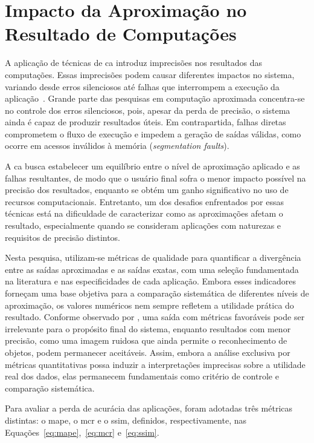 \section{Impacto da Aproximação no Resultado de Computações}\label{sec:impacto}

A aplicação de técnicas de \gls{ca} introduz imprecisões nos resultados das computações. Essas imprecisões podem causar diferentes impactos no sistema, variando desde erros silenciosos até falhas que interrompem a execução da aplicação~\cite{fabricio2022}. Grande parte das pesquisas em computação aproximada concentra-se no controle dos erros silenciosos, pois, apesar da perda de precisão, o sistema ainda é capaz de produzir resultados úteis. Em contrapartida, falhas diretas comprometem o fluxo de execução e impedem a geração de saídas válidas, como ocorre em acessos inválidos à memória (\textit{segmentation faults}).

A \gls{ca} busca estabelecer um equilíbrio entre o nível de aproximação aplicado e as falhas resultantes, de modo que o usuário final sofra o menor impacto possível na precisão dos resultados, enquanto se obtém um ganho significativo no uso de recursos computacionais. Entretanto, um dos desafios enfrentados por essas técnicas está na dificuldade de caracterizar como as aproximações afetam o resultado, especialmente quando se consideram aplicações com naturezas e requisitos de precisão distintos.

Nesta pesquisa, utilizam-se métricas de qualidade para quantificar a divergência entre as saídas aproximadas e as saídas exatas, com uma seleção fundamentada na literatura e nas especificidades de cada aplicação. Embora esses indicadores forneçam uma base objetiva para a comparação sistemática de diferentes níveis de aproximação, os valores numéricos nem sempre refletem a utilidade prática do resultado. Conforme observado por , uma saída com métricas favoráveis pode ser irrelevante para o propósito final do sistema, enquanto resultados com menor precisão, como uma imagem ruidosa que ainda permite o reconhecimento de objetos, podem permanecer aceitáveis. Assim, embora a análise exclusiva por métricas quantitativas possa induzir a interpretações imprecisas sobre a utilidade real dos dados, elas permanecem fundamentais como critério de controle e comparação sistemática.

Para avaliar a perda de acurácia das aplicações, foram adotadas três métricas distintas: o \gls{mape}, o \gls{mcr} e o \gls{ssim}, definidos, respectivamente, nas Equações~\ref{eq:mape},~\ref{eq:mcr} e~\ref{eq:ssim}.

